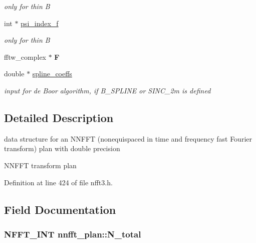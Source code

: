\begin{DoxyCompactItemize}
\begin{DoxyCompactList}\small\item\em only for thin B \end{DoxyCompactList}\item 
\hypertarget{structnnfft__plan_a2ada74222958e630640e6456e9bd2a8d}{int $\ast$ \hyperlink{structnnfft__plan_a2ada74222958e630640e6456e9bd2a8d}{psi\-\_\-index\-\_\-f}}\label{structnnfft__plan_a2ada74222958e630640e6456e9bd2a8d}

\begin{DoxyCompactList}\small\item\em only for thin B \end{DoxyCompactList}\item 
\hypertarget{structnnfft__plan_a86c8933dfbdbef02b98fd961bf00e01b}{fftw\-\_\-complex $\ast$ {\bfseries F}}\label{structnnfft__plan_a86c8933dfbdbef02b98fd961bf00e01b}

\item 
\hypertarget{structnnfft__plan_ac3e3c4b14a5227a96b8627faf6933652}{double $\ast$ \hyperlink{structnnfft__plan_ac3e3c4b14a5227a96b8627faf6933652}{spline\-\_\-coeffs}}\label{structnnfft__plan_ac3e3c4b14a5227a96b8627faf6933652}

\begin{DoxyCompactList}\small\item\em input for de Boor algorithm, if B\-\_\-\-S\-P\-L\-I\-N\-E or S\-I\-N\-C\-\_\-2m is defined \end{DoxyCompactList}\end{DoxyCompactItemize}


\subsection{Detailed Description}
data structure for an N\-N\-F\-F\-T (nonequispaced in time and frequency fast Fourier transform) plan with double precision 

N\-N\-F\-F\-T transform plan 

Definition at line 424 of file nfft3.\-h.



\subsection{Field Documentation}
\hypertarget{structnnfft__plan_a708632d14ec9f925d636ab5ca262f660}{
\subsubsection[{N\-\_\-total}]{\setlength{\rightskip}{0pt plus 5cm}N\-F\-F\-T\-\_\-\-I\-N\-T nnfft\-\_\-plan\-::\-N\-\_\-total}}\label{structnnfft__plan_a708632d14ec9f925d636ab5ca262f660}


